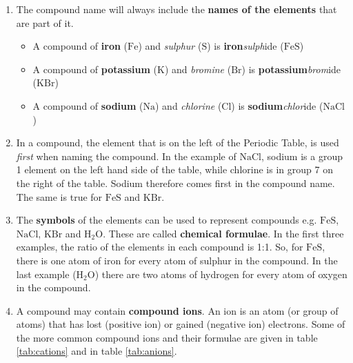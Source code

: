       \label{m38708*id64037}\begin{enumerate}[noitemsep, label=\textbf{\arabic*}. ] 
            \label{m38708*uid35}\item The compound name will always include the \textbf{names of the elements} that are part of it.
\label{m38708*id64059}\begin{itemize}[noitemsep]
            \label{m38708*uid36}\item A compound of \textbf{iron} ($\mathrm{Fe}$) and \textsl{sulphur} ($\mathrm{S}$) is \textbf{iron}\hspace{1ex}\textsl{sulph}ide ($\mathrm{FeS}$)
\label{m38708*uid37}\item A compound of \textbf{potassium} ($\mathrm{K}$) and \textsl{bromine} ($\mathrm{Br}$) is \textbf{potassium}\hspace{1ex}\textsl{brom}ide ($\mathrm{KBr}$)
\label{m38708*uid38}\item A compound of \textbf{sodium} ($\mathrm{Na}$) and \textsl{chlorine} ($\mathrm{Cl}$) is \textbf{sodium}\hspace{1ex}\textsl{chlor}ide ($\mathrm{NaCl}$)
\end{itemize}
        \label{m38708*uid39}\item In a compound, the element that is on the left of the Periodic Table, is used \textsl{first} when naming the compound. In the example of $\mathrm{NaCl}$, sodium is a group 1 element on the left hand side of the table, while chlorine is in group 7 on the right of the table. Sodium therefore comes first in the compound name. The same is true for $\mathrm{FeS}$ and $\mathrm{KBr}$.
\label{m38708*uid40}\item The \textbf{symbols} of the elements can be used to represent compounds e.g. $\mathrm{FeS}$, $\mathrm{NaCl}$, $\mathrm{KBr}$ and $\mathrm{H}{}_{2}\mathrm{O}$. These are called \textbf{chemical formulae}. In the first three examples, the ratio of the elements in each compound is 1:1. So, for $\mathrm{FeS}$, there is one atom of iron for every atom of sulphur in the compound. In the last example ($\mathrm{H}{}_{2}\mathrm{O}$) there are two atoms of hydrogen for every atom of oxygen in the compound.
\label{m38708*uid41}\item A compound may contain \textbf{compound ions}. An ion is an atom (or group of atoms) that has lost (positive ion) or gained (negative ion) electrons. Some of the more common compound ions and their formulae are given in table \ref{tab:cations} and in table \ref{tab:anions}.\\


\end{enumerate}
